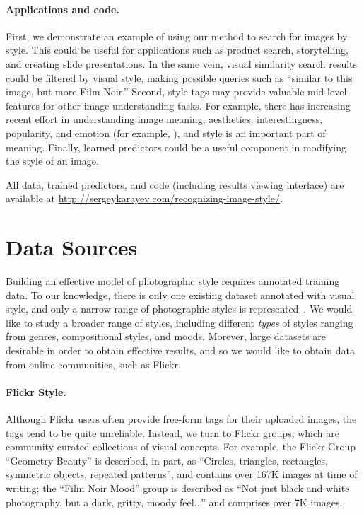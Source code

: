 \paragraph{Applications and code.}
First, we demonstrate an example of using our method to search for images by style.
This could be useful for applications such as product search, storytelling, and creating slide presentations.
In the same vein, visual similarity search results could be filtered by visual style, making possible queries such as ``similar to this image, but more Film Noir.''
Second, style tags may provide valuable mid-level features for other image understanding tasks.
For example, there has increasing recent effort in understanding image meaning, aesthetics, interestingness, popularity, and emotion (for example, \parencite{Gygli-ICCV-2013,Isola-CVPR-2011,joo2014,khosla2014}), and style is an important part of meaning.
Finally, learned predictors could be a useful component in modifying the style of an image.

All data, trained predictors, and code (including results viewing interface) are available at \url{http://sergeykarayev.com/recognizing-image-style/}.

\section{Data Sources}

Building an effective model of photographic style requires annotated training data.  To our knowledge, there is only one existing dataset annotated with visual style, and only a narrow range of photographic styles is represented~\parencite{Murray-CVPR-2012}.
We would like to study a broader range of styles, including different \textit{types} of styles ranging from genres, compositional styles, and moods.
Morever, large datasets are desirable in order to obtain effective results, and so we would like to obtain data from online communities, such as Flickr.

\paragraph{Flickr Style.}
Although Flickr users often provide free-form tags for their uploaded images, the tags tend to be quite unreliable.
Instead, we turn to Flickr groups, which are community-curated collections of visual concepts.
For example, the Flickr Group ``Geometry Beauty'' is described, in part, as ``Circles, triangles, rectangles, symmetric objects, repeated patterns'', and contains over 167K images at time of writing; the ``Film Noir Mood'' group is described as ``Not just  black and white photography, but a dark, gritty, moody feel...'' and comprises over 7K images.

